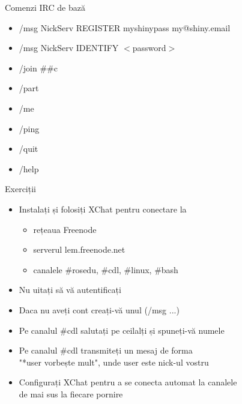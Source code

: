 \documentclass{beamer}
\begin{document}
    \begin{frame}{Comenzi IRC de bază}
    \begin{itemize}
    \setlength{\itemsep}{0.3cm}
    \item /msg NickServ REGISTER myshinypass my@shiny.email
    \item /msg NickServ IDENTIFY $<$password$>$
    \item /join \#\#c
    \item /part
    \item /me
    \item /ping
    \item /quit
    \item /help
    \end{itemize}
    \end{frame}

    \begin{frame}{Exerciții}
    \begin{itemize}
    \setlength{\itemsep}{0.4cm}
    \item Instalați și folosiți XChat pentru conectare la
        \begin{itemize}
        \item rețeaua Freenode
        \item serverul lem.freenode.net
        \item canalele \#rosedu, \#cdl, \#linux, \#bash
        \end{itemize}
    \item Nu uitați să vă autentificați
    \item Daca nu aveți cont creați-vă unul (/msg ...)
    \item Pe canalul \#cdl salutați pe ceilalți și spuneți-vă numele
    \item Pe canalul \#cdl transmiteți un mesaj de forma \\
          "*user vorbește mult", unde user este nick-ul vostru
    \item Configurați XChat pentru a se conecta automat la canalele \\
        de mai sus la fiecare pornire
    \end{itemize}
    \end{frame}
\end{document}
